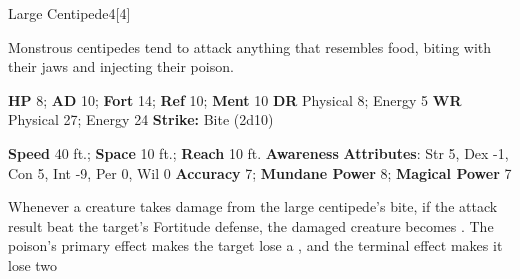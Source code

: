   \begin{monsection}{Large Centipede}{4}[4]
    \vspace{-1em}\vspace{-1em}
    \vspace{0em}

    
    Monstrous centipedes tend to attack anything that resembles food, biting with their jaws and injecting their poison.
  

    \begin{spellcontent}
      \begin{spelltargetinginfo}
        \pari \textbf{HP} 8;
          \textbf{AD} 10;
          \textbf{Fort} 14;
          \textbf{Ref} 10;
          \textbf{Ment} 10
        \pari \textbf{DR} Physical 8; Energy 5
        \pari \textbf{WR} Physical 27; Energy 24
        \pari \textbf{Strike:}
            Bite  (2d10)
      \end{spelltargetinginfo}
    \end{spellcontent}
    \begin{monsterfooter}
      \pari \textbf{Speed} 40 ft.;
        \textbf{Space} 10 ft.;
        \textbf{Reach} 10 ft.
      \pari \textbf{Awareness} 
      \pari \textbf{Attributes}:
        Str 5, Dex -1,
        Con 5, Int -9,
        Per 0, Wil 0
      \pari \textbf{Accuracy} 7;
        \textbf{Mundane Power} 8;
      \textbf{Magical Power} 7
    \end{monsterfooter}
  \end{monsection}
    Whenever a creature takes damage from the large centipede's bite,
      if the attack result beat the target's Fortitude defense,
      the damaged creature becomes .
    The poison's primary effect makes the target lose a , and the terminal effect makes it lose two 
  
